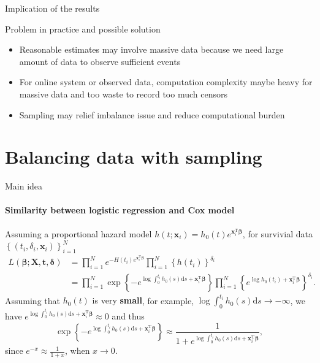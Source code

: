 \documentclass{beamer}
\newcommand{\blue}{\color{blue}}
\newcommand{\bbeta}{\bm{\beta}}
\newcommand{\x}{\bm{x}}
\newcommand{\X}{\bm{X}}
\newcommand{\tp}{^{\mathrm{T}}}
\newcommand{\bdelta}{\bm{\delta}}
\newcommand{\bt}{\bm{t}}
\begin{document}
    \begin{frame}{Implication of the results}

    \begin{block}{Problem in practice and possible solution}
        \begin{itemize}
            \item Reasonable estimates may involve {\blue massive data} because we need large amount of data to observe sufficient events
            \item For {\blue online system or observed data}, computation complexity maybe heavy for massive data and too waste to record too much censors
            \item Sampling may relief imbalance issue and reduce computational burden
        \end{itemize}
    \end{block}
    \end{frame}
    \section{Balancing data with sampling}
    \begin{frame}{Main idea}
    \framesubtitle{Similarity between logistic regression and Cox model}
        Assuming a proportional hazard model $h(t;\x_i)=h_0(t)e^{\x_i\tp\bbeta}$, for survivial data $\left\{(t_i,\delta_i,\x_i)\right\}_{i=1}^{N}$
        \begin{align*}
            L(\bbeta;\X,\bt,\bdelta)&=\prod_{i=1}^{N}e^{-H(t_i)e^{\x_i\tp\bbeta}}\prod_{i=1}^N\left\{h(t_i)\right\}^{\delta_i}\\
            &=\prod_{i=1}^N \exp\left\{-e^{\log\int_{0}^{t_i}h_0(s)\mathrm{d}s+\x_i\tp\bbeta}\right\}
            \prod_{i=1}^N\left\{e^{\log h_0(t_i)+\x_i\tp\bbeta}\right\}^{\delta_i}.
        \end{align*}
        Assuming that {\blue $h_0(t)$ is very \textbf{small}}, for example, $\log\int_{0}^{t_i}h_0(s)\mathrm{d}s\to-\infty$, we have $e^{\log\int_{0}^{t_i}h_0(s)\mathrm{d}s+\x_i\tp\bbeta}\approx 0$ and thus
        \begin{equation*}
            \exp\left\{-e^{\log\int_{0}^{t_i}h_0(s)\mathrm{d}s+\x_i\tp\bbeta}\right\}
            \approx\frac{1}{1+e^{\log\int_{0}^{t_i}h_0(s)\mathrm{d}s+\x_i\tp\bbeta}},
        \end{equation*}
        since {\blue $e^{-x}\approx \frac{1}{1+x}$}, when $x\to 0$.
    \end{frame}
\end{document}
